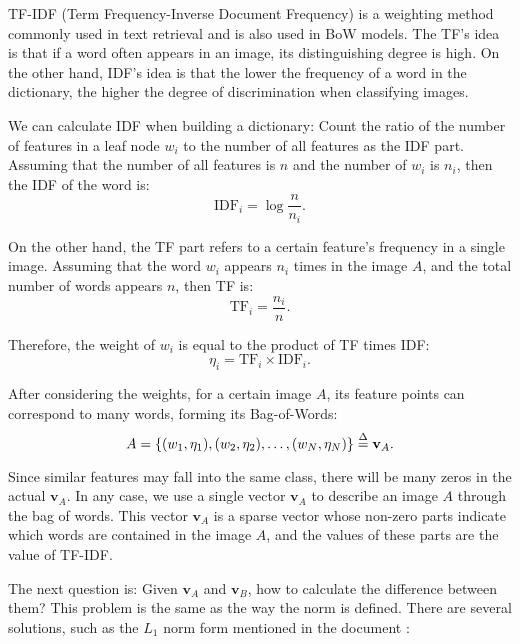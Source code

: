 TF-IDF (Term Frequency-Inverse Document Frequency) {\cite{Sivic2003, Robertson2004}} is a weighting method commonly used in text retrieval and is also used in BoW models. The TF's idea is that if a word often appears in an image, its distinguishing degree is high. On the other hand, IDF's idea is that the lower the frequency of a word in the dictionary, the higher the degree of discrimination when classifying images.

We can calculate IDF when building a dictionary: Count the ratio of the number of features in a leaf node $w_i$ to the number of all features as the IDF part. Assuming that the number of all features is $n$ and the number of $w_i$ is $n_i$, then the IDF of the word is:
\begin{equation}
	\mathrm{IDF}_i = \log \frac{n}{n_i}.
\end{equation}

On the other hand, the TF part refers to a certain feature's frequency in a single image. Assuming that the word $w_i$ appears $n_i$ times in the image $A$, and the total number of words appears $n$, then TF is:
\begin{equation}
	\mathrm{TF}_i = \frac{n_i}{n}.
\end{equation}

Therefore, the weight of $w_i$ is equal to the product of TF times IDF:
\begin{equation}
	\eta_i = \mathrm{TF}_i \times \mathrm{IDF}_i.
\end{equation}

After considering the weights, for a certain image $A$, its feature points can correspond to many words, forming its Bag-of-Words:
\begin{equation}
	A = \left\{ (w_1, \eta_1), (w_2, \eta_2), \ldots, (w_N, \eta_N)  \right\} \buildrel \Delta \over = \mathbf{v}_A.
\end{equation}

Since similar features may fall into the same class, there will be many zeros in the actual $\mathbf{v}_A$. In any case, we use a single vector $\mathbf{v}_A$ to describe an image $A$ through the bag of words. This vector $\mathbf{v}_A$ is a sparse vector whose non-zero parts indicate which words are contained in the image $A$, and the values of these parts are the value of TF-IDF.

The next question is: Given $\mathbf{v}_A$ and $\mathbf{v}_B$, how to calculate the difference between them? This problem is the same as the way the norm is defined. There are several solutions, such as the $L_1$ norm form mentioned in the document \cite{Nister2006}:

